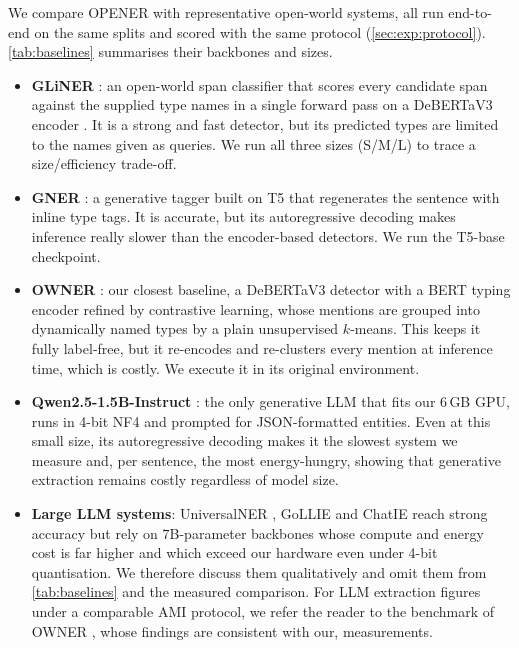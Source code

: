 We compare OPENER with representative open-world systems, all run end-to-end on the same splits and scored with the same protocol (\autoref{sec:exp:protocol}). \autoref{tab:baselines} summarises their backbones and sizes.
\begin{itemize}
\item \textbf{GLiNER} \cite{zaratiana2024gliner}: an open-world span classifier that scores every candidate span against the supplied type names in a single forward pass on a DeBERTaV3 encoder \cite{he2023debertav3}. It is a strong and fast detector, but its predicted types are limited to the names given as queries. We run all three sizes (S/M/L) to trace a size/efficiency trade-off.
\item \textbf{GNER} \cite{ding2024gner}: a generative tagger built on T5 \cite{raffel2020t5} that regenerates the sentence with inline type tags. It is accurate, but its autoregressive decoding makes inference really slower than the encoder-based detectors. We run the T5-base checkpoint.
\item \textbf{OWNER} \cite{genest2025owner}: our closest baseline, a DeBERTaV3 detector with a BERT typing encoder \cite{devlin2019bert} refined by contrastive learning, whose mentions are grouped into dynamically named types by a plain unsupervised $k$-means. This keeps it fully label-free, but it re-encodes and re-clusters every mention at inference time, which is costly. We execute it in its original environment.
\item \textbf{Qwen2.5-1.5B-Instruct} \cite{qwen2025}: the only generative LLM that fits our $6$\,GB GPU, runs in 4-bit NF4 \cite{dettmers2023qlora} and prompted for JSON-formatted entities. Even at this small size, its autoregressive decoding makes it the slowest system we measure and, per sentence, the most energy-hungry, showing that generative extraction remains costly regardless of model size.
\item \textbf{Large LLM systems}: UniversalNER \cite{zhou2024universalner}, GoLLIE \cite{sainz2024gollie} and ChatIE \cite{wei2024chatie} reach strong accuracy but rely on $7$B-parameter backbones \cite{touvron2023llama} whose compute and energy cost is far higher and which exceed our hardware even under 4-bit quantisation. We therefore discuss them qualitatively and omit them from \autoref{tab:baselines} and the measured comparison. For LLM extraction figures under a comparable AMI protocol, we refer the reader to the benchmark of OWNER \cite{genest2025owner}, whose findings are consistent with our, measurements.
\end{itemize}

